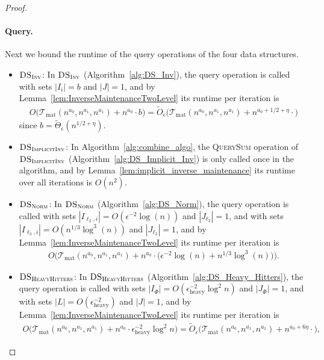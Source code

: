 \documentclass[11pt]{article}
\newcommand{\Tmat}{\mathcal{T}_{\mathrm{mat}}}
\newcommand{\wt}{\widetilde}
\newcommand{\heavy}{\text{heavy}}
\begin{document}
\begin{proof}
\paragraph{Query.} Next we bound the runtime of the query operations of the four data structures.
\begin{itemize}
\item $\textsc{DS}_{\textsc{Inv}}$: In $\textsc{DS}_{\textsc{Inv}}$ (Algorithm~\ref{alg:DS_Inv}), the query operation is called with sets $|I_i| = b$ and $|J| = 1$, and by Lemma~\ref{lem:InverseMaintenanceTwoLevel} its runtime per iteration is
\begin{align*}
O\big(\Tmat(n^{a_0}, n^{a_1}, n^{a_1}) + n^{a_0} \cdot b\big) = \wt{O}_{\epsilon}\big(\Tmat(n^{a_0}, n^{a_1}, n^{a_1}) + n^{a_0 + 1/2 + \eta} \cdot \big)
\end{align*}
since $b = \wt{\Theta}_{\epsilon}(n^{1/2+\eta} )$.
\item $\textsc{DS}_{\textsc{ImplicitInv}}$: In Algorithm~\ref{alg:combine_algo}, the \textsc{QuerySum} operation of $\textsc{DS}_{\textsc{ImplicitInv}}$ (Algorithm~\ref{alg:DS_Implicit_Inv}) is only called once in the algorithm, and by Lemma~\ref{lem:implicit_inverse_maintenance} its runtime over all iterations is $O(n^2)$.
\item $\textsc{DS}_{\textsc{Norm}}$: In $\textsc{DS}_{\textsc{Norm}}$ (Algorithm~\ref{alg:DS_Norm}), the query operation is called with sets $|I_{\ell_2,i}| = O(\epsilon^{-2} \log(n))$ and $|J_{\ell_2}| = 1$, and with sets $|I_{\ell_3,i}| = O(n^{1/3} \log^3(n))$ and $|J_{\ell_3}| = 1$, and by Lemma~\ref{lem:InverseMaintenanceTwoLevel} its runtime per iteration is
\begin{align*}
O\Big(\Tmat(n^{a_0}, n^{a_1}, n^{a_1}) + n^{a_0} \cdot \big(\epsilon^{-2} \log(n) + n^{1/3} \log^3(n)\big)\Big).
\end{align*}
\item $\textsc{DS}_{\textsc{HeavyHitters}}$: In $\textsc{DS}_{\textsc{HeavyHitters}}$ (Algorithm~\ref{alg:DS_Heavy_Hitters}), the query operation is called with sets $|I_{\Phi}| = O(\epsilon_{\heavy}^{-2} \log^2 n)$ and $|J_{\Phi}| = 1$, and with sets $|L| = O(\epsilon_{\heavy}^{-2})$ and $|J| = 1$, and by Lemma~\ref{lem:InverseMaintenanceTwoLevel} its runtime per iteration is
\begin{align*}
O\big(\Tmat(n^{a_0}, n^{a_1}, n^{a_1}) + n^{a_0} \cdot \epsilon_{\heavy}^{-2} \log^2 n\big) 
= \wt{O}_{\epsilon}\big(\Tmat(n^{a_0}, n^{a_1}, n^{a_1}) + n^{a_0 + 6 \eta} \cdot \big),
\end{align*}

\end{itemize}
\end{proof}
\end{document}
